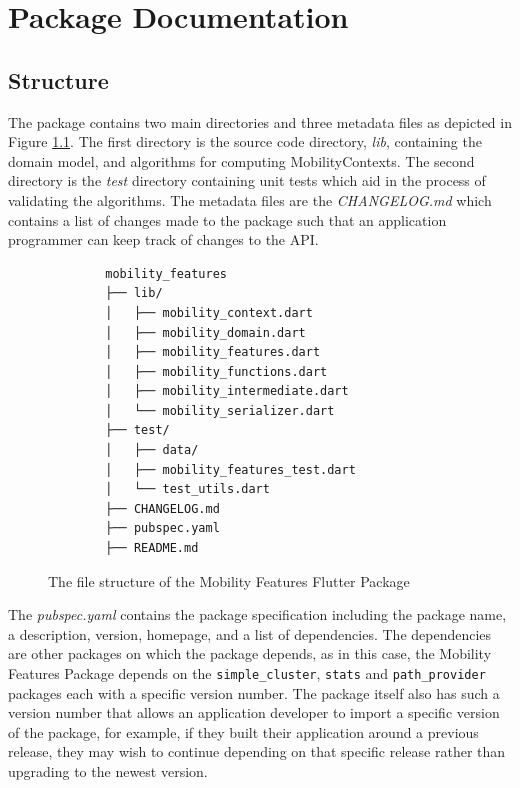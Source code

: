 \chapter{Package Documentation}
\section{Structure}
\label{appendix:package}
The package contains two main directories and three metadata files as depicted in Figure \ref{fig:package-structure}. The first directory is the source code directory, \textit{lib}, containing the domain model, and algorithms for computing MobilityContexts. The second directory is the \textit{test} directory containing unit tests which aid in the process of validating the algorithms. The metadata files are the \textit{CHANGELOG.md} which contains a list of changes made to the package such that an application programmer can keep track of changes to the API. 

\begin{figure}
    \centering
    \begin{verbatim}
        mobility_features
        ├── lib/
        │   ├── mobility_context.dart
        │   ├── mobility_domain.dart
        │   ├── mobility_features.dart
        │   ├── mobility_functions.dart
        │   ├── mobility_intermediate.dart
        │   └── mobility_serializer.dart
        ├── test/
        │   ├── data/
        │   ├── mobility_features_test.dart
        │   └── test_utils.dart
        ├── CHANGELOG.md
        ├── pubspec.yaml
        ├── README.md
    \end{verbatim}
    \caption{The file structure of the Mobility Features Flutter Package}
    \label{fig:package-structure}
\end{figure}

The \textit{pubspec.yaml} contains the package specification including the package name, a description, version, homepage, and a list of dependencies. The dependencies are other packages on which the package depends, as in this case, the Mobility Features Package depends on the \verb|simple_cluster|, \verb|stats| and \verb|path_provider| packages each with a specific version number. The package itself also has such a version number that allows an application developer to import a specific version of the package, for example, if they built their application around a previous release, they may wish to continue depending on that specific release rather than upgrading to the newest version.

